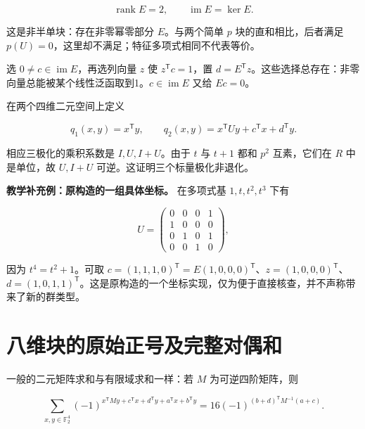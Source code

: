 \documentclass[UTF8,fontset=fandol,zihao=-4,openany,oneside]{ctexbook}
\begin{document}
\[
\operatorname{rank}E=2,\qquad \operatorname{im}E=\ker E.
\]



这是非半单块：存在非零幂零部分 \(E\)。与两个简单 \(p\) 块的直和相比，后者满足 \(p(U)=0\)，这里却不满足；特征多项式相同不代表等价。



选 \(0\ne c\in\operatorname{im}E\)，再选列向量 \(z\) 使 \(z^{\mathsf T}c=1\)，置 \(d=E^{\mathsf T}z\)。这些选择总存在：非零向量总能被某个线性泛函取到1。\(c\in\operatorname{im}E\) 又给 \(Ec=0\)。



在两个四维二元空间上定义



\[
q_1(x,y)=x^{\mathsf T}y,\qquad
q_2(x,y)=x^{\mathsf T}Uy+c^{\mathsf T}x+d^{\mathsf T}y.
\]



相应三极化的乘积系数是 \(I,U,I+U\)。由于 \(t\) 与 \(t+1\) 都和 \(p^2\) 互素，它们在 \(R\) 中是单位，故 \(U,I+U\) 可逆。这证明三个标量极化非退化。



\textbf{教学补充例：原构造的一组具体坐标。} 在多项式基 \(1,t,t^2,t^3\) 下有



\[
U=\begin{pmatrix}0&0&0&1\\1&0&0&0\\0&1&0&1\\0&0&1&0\end{pmatrix},
\]



因为 \(t^4=t^2+1\)。可取 \(c=(1,1,1,0)^{\mathsf T}=E(1,0,0,0)^{\mathsf T}\)、\(z=(1,0,0,0)^{\mathsf T}\)、\(d=(1,0,1,1)^{\mathsf T}\)。这是原构造的一个坐标实现，仅为便于直接核查，并不声称带来了新的群类型。



\section{八维块的原始正号及完整对偶和}


一般的二元矩阵求和与有限域求和一样：若 \(M\) 为可逆四阶矩阵，则



\[
\sum_{x,y\in\mathbb F_2^4}
(-1)^{x^{\mathsf T}My+c^{\mathsf T}x+d^{\mathsf T}y+a^{\mathsf T}x+b^{\mathsf T}y}
=16(-1)^{(b+d)^{\mathsf T}M^{-1}(a+c)}.
\]
\end{document}
